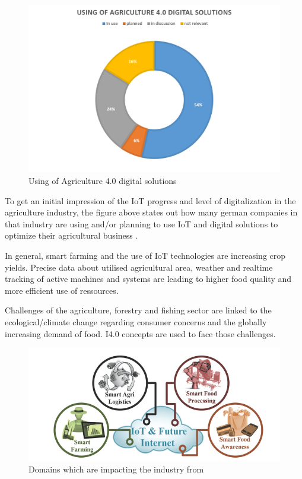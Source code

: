 \begin{figure}[H]
\centering
\includegraphics[width=1\columnwidth]{images/usingOfAgriculure4-0-solutions_pieChart}
\caption{Using of Agriculture 4.0 digital solutions \cite{digitAgrad}}
\end{figure}


To get an initial impression of the \ac{IoT} progress and level of digitalization in the agriculture industry, the figure above states out how many german companies in that industry are using and/or planning to use \ac{IoT} and digital solutions to optimize their agricultural business \cite{digitAgrad}.

In general, smart farming and the use of \ac{IoT} technologies are increasing crop yields. Precise data about utilised agricultural area, weather and realtime tracking of active machines and systems are leading to higher food quality and more efficient use of ressources.

Challenges of the agriculture, forestry and fishing sector are linked to the ecological/climate change regarding consumer concerns and the globally increasing demand of food. \ac{I4.0} concepts are used to face those challenges.


\begin{figure}[H]
\centering
\includegraphics[width=1\columnwidth]{images/digitising-industry_agriculture_smartFarming}
\caption{Domains which are impacting the industry from \cite[p.133]{FoodAndFarm2020}}
\end{figure}



